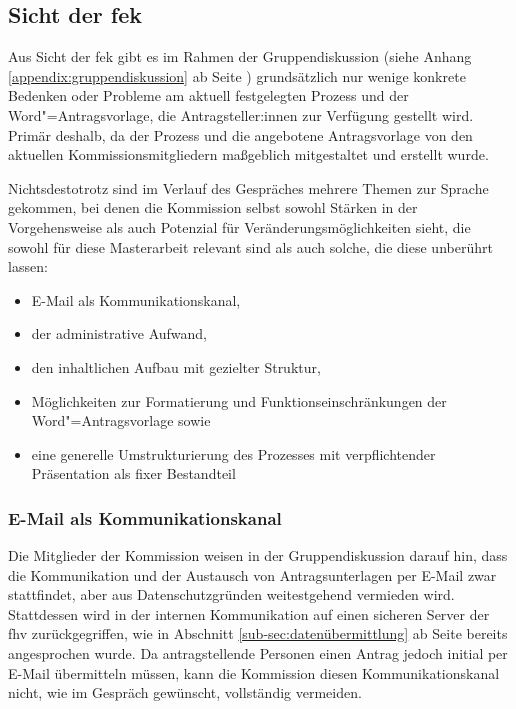 \documentclass[a4paper,12pt,twoside]{scrreprt}
\begin{document}
\subsection{Sicht der \acl{fek}}
\label{sub-sec:probleme-sicht-fek}

Aus Sicht der \acl{fek} gibt es im Rahmen der Gruppendiskussion (siehe Anhang \ref{appendix:gruppendiskussion} ab Seite \pageref{appendix:gruppendiskussion}) grundsätzlich nur wenige konkrete Bedenken oder Probleme am aktuell festgelegten Prozess und der Word"=Antragsvorlage, die Antragsteller:innen zur Verfügung gestellt wird. Primär deshalb, da der Prozess und die angebotene Antragsvorlage von den aktuellen Kommissionsmitgliedern maßgeblich mitgestaltet und erstellt wurde.

Nichtsdestotrotz sind im Verlauf des Gespräches mehrere Themen zur Sprache gekommen, bei denen die Kommission selbst sowohl Stärken in der Vorgehensweise als auch Potenzial für Veränderungsmöglichkeiten sieht, die sowohl für diese Masterarbeit relevant sind als auch solche, die diese unberührt lassen:
\begin{itemize}
    \item E-Mail als Kommunikationskanal,
    \item der administrative Aufwand,
    \item den inhaltlichen Aufbau mit gezielter Struktur,
    \item Möglichkeiten zur Formatierung und Funktionseinschränkungen der Word"=Antragsvorlage sowie
    \item eine generelle Umstrukturierung des Prozesses mit verpflichtender Präsentation als fixer Bestandteil
\end{itemize}

\subsubsection*{E-Mail als Kommunikationskanal}
\label{sub-sub-sec:email-kommunikationskanal}

Die Mitglieder der Kommission weisen in der Gruppendiskussion darauf hin, dass die Kommunikation und der Austausch von Antragsunterlagen per E-Mail zwar stattfindet, aber aus Datenschutzgründen weitestgehend vermieden wird. Stattdessen wird in der internen Kommunikation auf einen sicheren Server der \acl{fhv} zurückgegriffen, wie in Abschnitt \ref{sub-sec:datenübermittlung} ab Seite \pageref{sub-sec:datenübermittlung} bereits angesprochen wurde. Da antragstellende Personen einen Antrag jedoch initial per E-Mail übermitteln müssen, kann die Kommission diesen Kommunikationskanal nicht, wie im Gespräch gewünscht, vollständig vermeiden.
\end{document}
